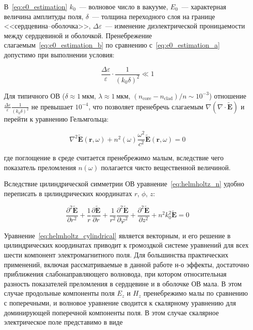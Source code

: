 В~\cref{eq:e0_estimation} $k_0$~--- волновое число в вакууме, $E_0$~--- характерная величина амплитуды поля, $\delta$~--- толщина переходного слоя на границе <<сердцевина--оболочка>>, $\Delta \varepsilon$~--- изменение диэлектрической проницаемости между сердцевиной и оболочкой. Пренебрежение слагаемым~\cref{eq:e0_estimation_b} по сравнению с~\cref{eq:e0_estimation_a} допустимо при выполнении условия:

\begin{equation}\label{eq:weak_guidance_criterion}
	\frac{\Delta \varepsilon}{\varepsilon} \cdot \frac{1}{(k_0 \delta)^2} \ll 1
\end{equation}



Для типичного ОВ ($\delta \approx 1~\text{мкм}$, $\lambda \approx 1~\text{мкм}$, $(n_{\text{core}}-n_{\text{clad}})/n \sim 10^{-3}$) отношение $\frac{\Delta\varepsilon}{\varepsilon} \frac{1}{(k_0 \delta)^2}$ не превышает $10^{-4}$, что позволяет пренебречь слагаемым $\nabla(\nabla \cdot \widetilde{\mathbf{E}})$ и перейти к уравнению Гельмгольца:

\begin{equation}\label{eq:helmholtz_n}
	\nabla^2 \widetilde{\mathbf{E}}(\mathbf{r},\omega) + n^2(\omega) \frac{\omega^2}{c^2} \widetilde{\mathbf{E}}(\mathbf{r},\omega) = 0
\end{equation}

где поглощение в среде считается пренебрежимо малым, вследствие чего показатель преломления $n(\omega)$ полагается чисто вещественной величиной.

Вследствие цилиндрической симметрии ОВ уравнение~\cref{eq:helmholtz_n} удобно переписать в цилиндрических координатах $r$, $\phi$, $z$:

\begin{equation}\label{eq:helmholtz_cylindrical}
	\frac{\partial^2 \widetilde{\mathbf{E}}}{\partial r^2} + \frac{1}{r} \frac{\partial \widetilde{\mathbf{E}}}{\partial r} + \frac{1}{r^2} \frac{\partial^2 \widetilde{\mathbf{E}}}{\partial \varphi^2} + \frac{\partial^2 \widetilde{\mathbf{E}}}{\partial z^2} + n^2 k_0^2 \widetilde{\mathbf{E}} = 0
\end{equation}


Уравнение~\eqref{eq:helmholtz_cylindrical} является векторным, и его решение в цилиндрических координатах приводит к громоздкой системе уравнений для всех шести компонент электромагнитного поля. Для большинства практических применений, включая рассматриваемые в данной работе н-о эффекты, достаточно приближения слабонаправляющего волновода, при котором относительная разность показателей преломления в сердцевине и в оболочке ОВ мала. В этом случае продольные компоненты поля $E_z$ и $H_z$ пренебрежимо малы по сравнению с поперечными, и волновое уравнение сводится к скалярному уравнению для доминирующей поперечной компоненты поля. В этом случае скалярное электрическое поле представимо в виде

